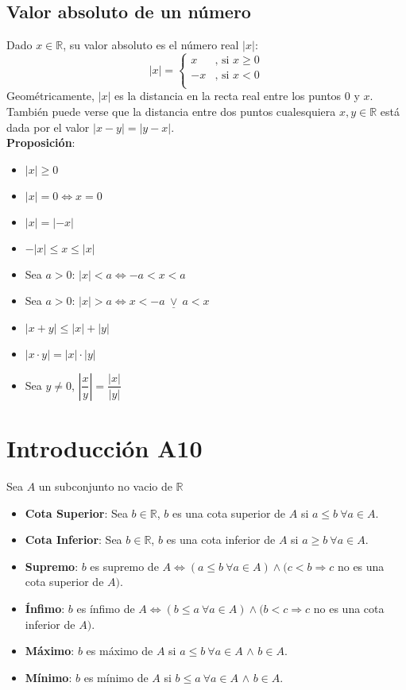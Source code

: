 \documentclass[11pt,a4paper]{article}
\begin{document}
\subsection{Valor absoluto de un n\'umero}
Dado $x \in \mathbb{R}$, su valor absoluto es el n\'umero real $|x| : $
\[|x| = \left\{
\begin{array}{ll}
x  & \text{, si } x \geq 0\\
-x & \text{, si } x < 0\\
\end{array} \right.
\]
Geom\'etricamente, $|x|$ es la distancia en la recta real entre los puntos $0$ y $x$. Tambi\'en puede verse que la distancia entre dos puntos cualesquiera $x,y \in \mathbb{R}$ est\'a dada por el valor $|x - y| = |y - x|$.\\

\noindent \textbf{Proposici\'on}:
\begin{multicols}{2}
\begin{itemize}
\item $|x| \geq 0$
\item $|x| = 0 \iff x = 0$
\item $|x| = |-x|$
\item $-|x| \leq x \leq |x|$
\item Sea $a>0$: $|x| < a \iff -a < x < a$
\item Sea $a>0$: $|x| > a \iff x < -a\ \underline{\lor}\ a < x$
\item $|x+y| \leq |x| + |y|$
\item $|x \cdot y| = |x| \cdot |y|$
\item Sea $y \not = 0$, $\left|\dfrac{x}{y}\right| = \dfrac{|x|}{|y|}$
\end{itemize}
\end{multicols}

\section{Introducci\'on A10}
Sea $A$ un subconjunto no vacio de $\mathbb{R}$
\begin{itemize}
\item \textbf{Cota Superior}: Sea $b \in \mathbb{R}$, $b$ es una cota superior de $A$ si $a \leq b\ \forall a \in A$.
\item \textbf{Cota Inferior}: Sea $b \in \mathbb{R}$, $b$ es una cota inferior de $A$ si $a \geq b\ \forall a \in A$.\\

\item \textbf{Supremo}: $b$ es supremo de $A \iff (a \leq b\ \forall a \in A) \land (c < b \Rightarrow c$ no es una cota superior de $A)$.
\item \textbf{\'Infimo}: $b$ es \'infimo de $A \iff (b \leq a\ \forall a \in A) \land (b < c \Rightarrow c$ no es una cota inferior de $A)$.\\

\item \textbf{M\'aximo}: $b$ es m\'aximo de $A$ si $a \leq b\ \forall a \in A$ $\land$ $b \in A$.
\item \textbf{M\'inimo}: $b$ es m\'inimo de $A$ si $b \leq a\ \forall a \in A$ $\land$ $b \in A$.
\end{itemize}
\end{document}
